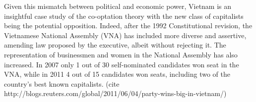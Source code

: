Given this mismatch between political and economic power, Vietnam is an insightful case study of the co-optation theory with the new class of capitalists being the potential opposition. Indeed, after the 1992 Constitutional revision, the Vietnamese National Assembly (VNA) has included more diverse and assertive, amending law proposed by the executive, albeit without rejecting it. The representation of businessmen and women in the National Assembly has also increased. In 2007 only 1 out of 30 self-nominated candidates won seat in the VNA, while in 2011 4 out of 15 candidates won seats, including two of the country's best known capitalists. (cite http://blogs.reuters.com/global/2011/06/04/party-wins-big-in-vietnam/)



